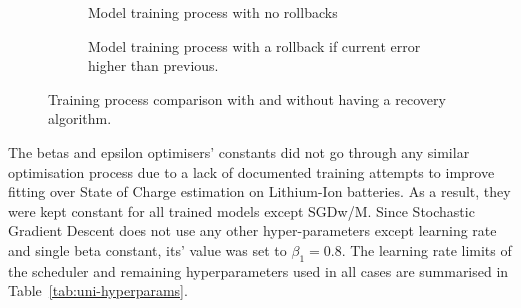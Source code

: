 \begin{figure}[htbp]
  \centering
  \begin{subfigure}[b]{0.45\textwidth}
      \centering
      
      \caption{Model training process with no rollbacks}
      \label{subfig:no-rollback}
  \end{subfigure}
  \hfill
  \begin{subfigure}[b]{0.45\textwidth}
      \centering
      
      \caption{Model training process with a rollback if current error higher than previous.}
      \label{subfig:rollback}
  \end{subfigure}
  \caption{Training process comparison with and without having a recovery algorithm.}
  \label{fig:rollback}
\end{figure}

%
The betas and epsilon optimisers' constants did not go through any similar optimisation process due to a lack of documented training attempts to improve fitting over State of Charge estimation on Lithium-Ion batteries.
As a result, they were kept constant for all trained models except SGDw/M.
Since Stochastic Gradient Descent does not use any other hyper-parameters except learning rate and single beta constant, its' value was set to $\beta_1 = 0.8$.
The learning rate limits of the scheduler and remaining hyperparameters used in all cases are summarised in \mbox{Table~\ref{tab:uni-hyperparams}}.
\begin{table}[htbp]
  \renewcommand{\arraystretch}{1.3}
  \caption{Optimiser Hyper-Parameters}
  \centering
  \label{tab:uni-hyperparams}
\end{table}

